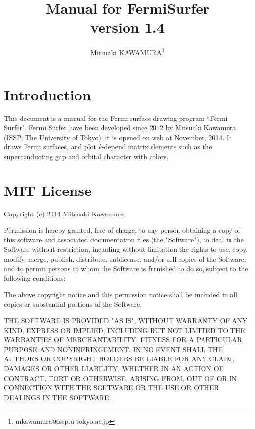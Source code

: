 \documentclass[12pt]{article}
\begin{document}
%
%
\title{Manual for FermiSurfer\\
version 1.4}
\author{Mitsuaki KAWAMURA\footnote{mkawamura@issp.u-tokyo.ac.jp}}
\maketitle

\tableofcontents

\section{Introduction}

This document is a manual for the Fermi surface drawing program ``Fermi Surfer".
Fermi Surfer have been  developed since 2012 by Mitsuaki Kawamura
(ISSP, The University of Tokyo); 
it is opened on web at November, 2014.
It draws Fermi surfaces, and 
plot $k$-depend matrix elements such as the superconducting gap and
orbital character with colors.

\section{MIT License}

Copyright (c) 2014 Mitsuaki Kawamura

\vspace{0.5cm}
Permission is hereby granted, free of charge, to any person obtaining a copy
of this software and associated documentation files (the "Software"), to deal
in the Software without restriction, including without limitation the rights
to use, copy, modify, merge, publish, distribute, sublicense, and/or sell
copies of the Software, and to permit persons to whom the Software is
furnished to do so, subject to the following conditions:

\vspace{0.5cm}
The above copyright notice and this permission notice shall be included in
all copies or substantial portions of the Software.

\vspace{0.5cm}
THE SOFTWARE IS PROVIDED "AS IS", WITHOUT WARRANTY OF ANY KIND, EXPRESS OR
IMPLIED, INCLUDING BUT NOT LIMITED TO THE WARRANTIES OF MERCHANTABILITY,
FITNESS FOR A PARTICULAR PURPOSE AND NONINFRINGEMENT. IN NO EVENT SHALL THE
AUTHORS OR COPYRIGHT HOLDERS BE LIABLE FOR ANY CLAIM, DAMAGES OR OTHER
LIABILITY, WHETHER IN AN ACTION OF CONTRACT, TORT OR OTHERWISE, ARISING FROM,
OUT OF OR IN CONNECTION WITH THE SOFTWARE OR THE USE OR OTHER DEALINGS IN
THE SOFTWARE.
\end{document}
